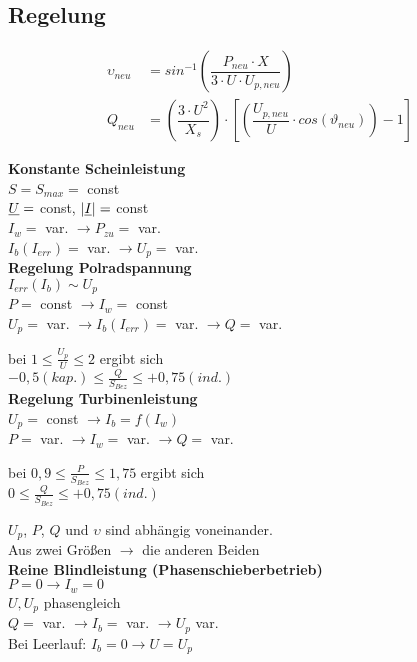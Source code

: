 \subsection{Regelung}
\begin{align*}
    \upsilon_{neu} &= sin^{-1}\left( \dfrac{P_{neu} \cdot X}{3 \cdot U \cdot U_{p,neu}}\right)\\
    Q_{neu} &= \left( \dfrac{3 \cdot U^2}{X_s}\right) \cdot \left[ \left( \dfrac{U_{p,neu}}{U} \cdot cos( \vartheta_{neu})\right)-1\right]
\end{align*}

\textbf{Konstante Scheinleistung}\\
\indent $S = S_{max} =$ const\\
\indent $\underline{U}=$ const, $|\underline{I}| =$ const\\
\indent $I_w =$ var. $\rightarrow P_{zu}=$ var.\\
\indent $I_b(I_{err}) =$ var. $\rightarrow U_p =$ var.\\

\textbf{Regelung Polradspannung}\\
\indent $I_{err}(I_b) \sim U_p$ \\
\indent $P =$ const $\rightarrow I_w= $ const\\
\indent $U_p =$ var. $\rightarrow I_b(I_{err}) = $ var. $\rightarrow Q=$ var.

\indent bei $1 \leq \frac{U_p}{U} \leq 2$ ergibt sich \\
\indent $-0,5 (kap.) \leq \frac{Q}{S_{Bez}} \leq +0,75(ind.)$\\

\textbf{Regelung Turbinenleistung}\\
\indent $U_p =$ const $\rightarrow I_b = f(I_w)$\\
\indent $P =$ var. $\rightarrow I_w= $ var. $\rightarrow Q =$ var.

\indent bei $0,9 \leq \frac{P}{S_{Bez}} \leq 1,75$ ergibt sich\\
\indent $0 \leq \frac{Q}{S_{Bez}} \leq +0,75(ind.)$

$U_p$, $ P$, $Q$ und $\upsilon$ sind abhängig voneinander. \\
Aus zwei Größen $\rightarrow$ die anderen Beiden\\

\textbf{Reine Blindleistung (Phasenschieberbetrieb)}\\
\indent $P = 0 \rightarrow I_w= 0$ \\
$U, U_p$ phasengleich\\
\indent $Q =$ var. $\rightarrow I_b = $ var. $\rightarrow U_p$ var.\\
Bei Leerlauf: $I_b = 0 \rightarrow U = U_p$
